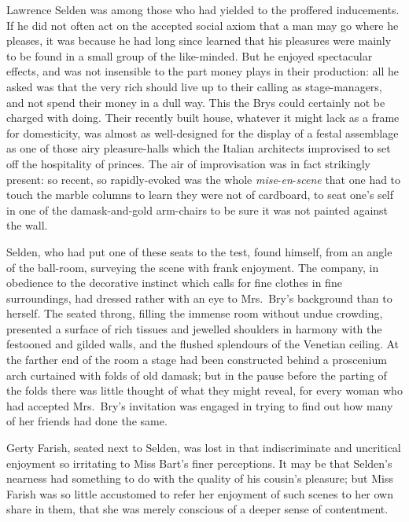\documentclass[12pt,a4paper]{book}
\begin{document}
Lawrence Selden was among those who had yielded to the proffered
inducements. If he did not often act on the accepted social axiom
that a man may go where he pleases, it was because he had
long since learned that his pleasures were mainly to be found in
a small group of the like-minded. But he enjoyed spectacular
effects, and was not insensible to the part money plays in their
production: all he asked was that the very rich should live up to
their calling as stage-managers, and not spend their money in a
dull way. This the Brys could certainly not be charged with
doing. Their recently built house, whatever it might lack as a
frame for domesticity, was almost as well-designed for the
display of a festal assemblage as one of those airy
pleasure-halls which the Italian architects improvised to set off
the hospitality of princes. The air of improvisation was in fact
strikingly present: so recent, so rapidly-evoked was the whole
\textit{mise}-\textit{en}-\textit{scene} that one had to touch the marble columns to learn
they were not of cardboard, to seat one's self in one of the
damask-and-gold arm-chairs to be sure it was not painted against
the wall.





Selden, who had put one of these seats to the test, found
himself, from an angle of the ball-room, surveying the scene with
frank enjoyment. The company, in obedience to the decorative
instinct which calls for fine clothes in fine surroundings, had
dressed rather with an eye to Mrs.\ Bry's background than to
herself. The seated throng, filling the immense room without
undue crowding, presented a surface of rich tissues and jewelled
shoulders in harmony with the festooned and gilded walls, and the
flushed splendours of the Venetian ceiling. At the farther end of
the room a stage had been constructed behind a proscenium arch
curtained with folds of old damask; but in the pause before the
parting of the folds there was little thought of what they might
reveal, for every woman who had accepted Mrs.\ Bry's invitation
was engaged in trying to find out how many of her friends had
done the same.





Gerty Farish, seated next to Selden, was lost in that
indiscriminate and uncritical enjoyment so irritating to Miss
Bart's finer perceptions. It may be that Selden's nearness had
something to do with the quality of his cousin's pleasure; but
Miss Farish was so little accustomed to refer her enjoyment of
such scenes to her own share in them, that she was merely
conscious of a deeper sense of contentment.
\end{document}
